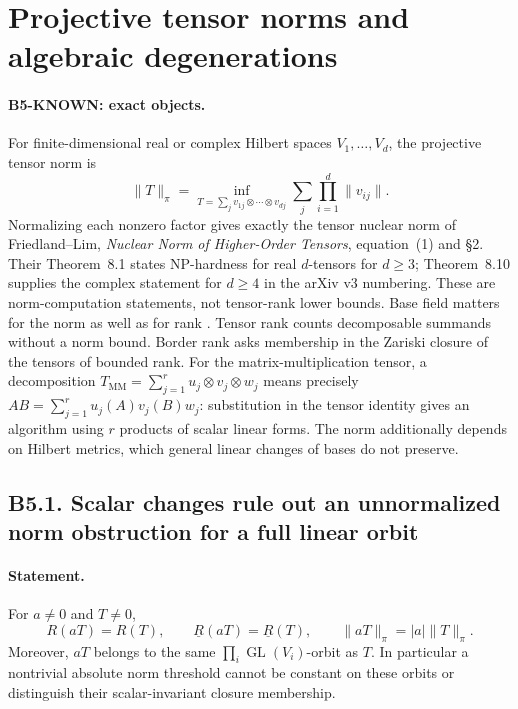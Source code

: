 \documentclass[11pt,a4paper]{article}
\begin{document}
\section{Projective tensor norms and algebraic degenerations}
\label{sec:bridge-norm}

\paragraph{B5-KNOWN: exact objects.}
For finite-dimensional real or complex Hilbert spaces $V_1,\ldots,V_d$,
the projective tensor norm is
\[
 \|T\|_\pi=
 \inf_{T=\sum_j v_{1j}\otimes\cdots\otimes v_{dj}}
        \sum_j\prod_{i=1}^d\|v_{ij}\|.
\]
Normalizing each nonzero factor gives exactly the tensor nuclear norm
of Friedland--Lim, \emph{Nuclear Norm of Higher-Order Tensors},
equation~(1) and \S2.  Their Theorem~8.1 states NP-hardness for real
$d$-tensors for $d\geq3$; Theorem~8.10 supplies the complex statement
for $d\geq4$ in the arXiv v3 numbering.  These are norm-computation
statements, not tensor-rank lower bounds.  Base field matters for the
norm as well as for rank \cite{friedland-lim2018}.
Tensor rank counts decomposable summands without a norm bound.
Border rank asks membership in the Zariski closure of the tensors of
bounded rank.  For the matrix-multiplication tensor, a decomposition
$T_{\mathrm{MM}}=\sum_{j=1}^r u_j\otimes v_j\otimes w_j$ means precisely
$AB=\sum_{j=1}^r u_j(A)v_j(B)w_j$: substitution in the tensor identity
gives an algorithm using $r$ products of scalar linear forms.
The norm additionally depends on Hilbert metrics, which general linear
changes of bases do not preserve.

\subsection*{B5.1. Scalar changes rule out an unnormalized norm obstruction for a full linear orbit}
\paragraph{Statement.}
For $a\neq0$ and $T\neq0$,
\[
 R(aT)=R(T),\qquad \underline R(aT)=\underline R(T),
 \qquad \|aT\|_\pi=|a|\|T\|_\pi.
\]
Moreover, $aT$ belongs to the same
$\prod_i\operatorname{GL}(V_i)$-orbit as $T$.  In particular a
nontrivial absolute norm threshold cannot be constant on these orbits
or distinguish their scalar-invariant closure membership.
\end{document}
